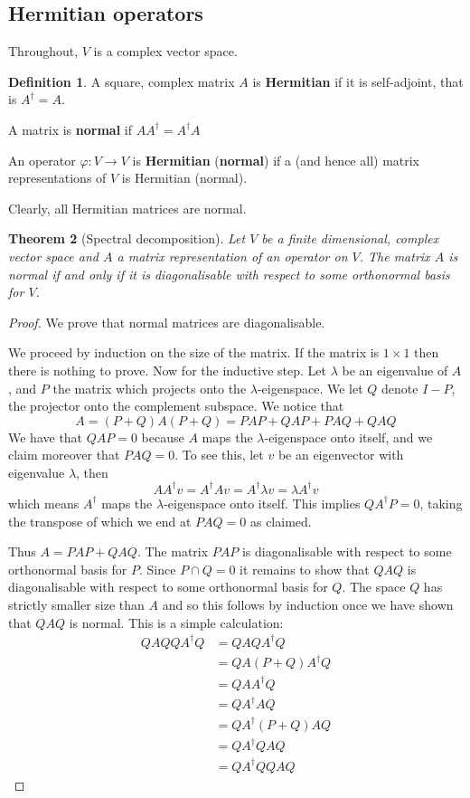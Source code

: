 \documentclass[12pt]{article}
\theoremstyle{plain}
\newtheorem{thm}{Theorem}[subsection] %
\theoremstyle{definition}
\newtheorem{defn}[thm]{Definition} %
\newcommand{\lto}{\longrightarrow}
\begin{document}
\subsection{Hermitian operators}
Throughout, $V$ is a complex vector space.
\begin{defn}
A square, complex matrix $A$ is \textbf{Hermitian} if it is self-adjoint, that is $A^\dagger = A$.

A matrix is \textbf{normal} if $AA^\dagger = A^\dagger A$

An operator $\varphi:V \lto V$ is \textbf{Hermitian} (\textbf{normal}) if a (and hence all) matrix representations of $V$ is Hermitian (normal).
\end{defn}
Clearly, all Hermitian matrices are normal.
\begin{thm}[Spectral decomposition]\label{thm:spectral}
Let $V$ be a finite dimensional, complex vector space and $A$ a matrix representation of an operator on $V$. The matrix $A$ is normal if and only if it is diagonalisable with respect to some orthonormal basis for $V$.
\end{thm}
\begin{proof}
We prove that normal matrices are diagonalisable.

We proceed by induction on the size of the matrix. If the matrix is $1\times 1$ then there is nothing to prove. Now for the inductive step. Let $\lambda$ be an eigenvalue of $A$, and $P$ the matrix which projects onto the $\lambda$-eigenspace. We let $Q$ denote $I - P$, the projector onto the complement subspace.  We notice that
\begin{equation}
A = (P + Q)A(P + Q)= PAP + QAP + PAQ + QAQ
\end{equation}
We have that $QAP = 0$ because $A$ maps the $\lambda$-eigenspace onto itself, and we claim moreover that $PAQ = 0$. To see this, let $v$ be an eigenvector with eigenvalue $\lambda$, then
\begin{equation}
AA^{\dagger}v = A^{\dagger}Av = A^{\dagger} \lambda v = \lambda A^\dagger v
\end{equation}
which means $A^\dagger$ maps the $\lambda$-eigenspace onto itself. This implies $QA^\dagger P = 0$, taking the transpose of which we end at $P A Q = 0$ as claimed.

Thus $A = PAP + QAQ$. The matrix $PAP$ is diagonalisable with respect to some orthonormal basis for $P$. Since $P \cap Q = 0$ it remains to show that $QAQ$ is diagonalisable with respect to some orthonormal basis for $Q$. The space $Q$ has strictly smaller size than $A$ and so this follows by induction once we have shown that $QAQ$ is normal. This is a simple calculation:
\begin{align*}
QAQQA^\dagger Q &= QAQA^\dagger Q\\
&= QA(P + Q)A^\dagger Q\\
&= QAA^\dagger Q\\
&= QA^\dagger AQ\\
&= QA^\dagger (P + Q)AQ\\
&= QA^\dagger QAQ \\
&= QA^\dagger QQ A Q
\end{align*}
\end{proof}
\end{document}
